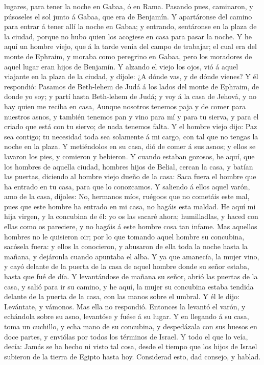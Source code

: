 lugares, para tener la noche en Gabaa, ó en Rama. 
Pasando pues, caminaron, y púsoseles el sol junto á Gabaa, que era de
Benjamín.  Y apartáronse del camino para entrar á tener
allí la noche en Gabaa; y entrando, sentáronse en la plaza de la ciudad,
porque no hubo quien los acogiese en casa para pasar la noche.
 Y he aquí un hombre viejo, que á la tarde venía del
campo de trabajar; el cual era del monte de Ephraim, y moraba como
peregrino en Gabaa, pero los moradores de aquel lugar eran hijos de
Benjamín.  Y alzando el viejo los ojos, vió á aquel
viajante en la plaza de la ciudad, y díjole: ¿A dónde vas, y de dónde
vienes?  Y él respondió: Pasamos de Beth-lehem de Judá á
los lados del monte de Ephraim, de donde yo soy; y partí hasta
Beth-lehem de Judá; y voy á la casa de Jehová, y no hay quien me reciba
en casa,  Aunque nosotros tenemos paja y de comer para
nuestros asnos, y también tenemos pan y vino para mí y para tu sierva, y
para el criado que está con tu siervo; de nada tenemos falta.
 Y el hombre viejo dijo: Paz sea contigo; tu necesidad
toda sea solamente á mi cargo, con tal que no tengas la noche en la
plaza.  Y metiéndolos en su casa, dió de comer á sus
asnos; y ellos se lavaron los pies, y comieron y bebieron.
 Y cuando estaban gozosos, he aquí, que los hombres de
aquella ciudad, hombres hijos de Belial, cercan la casa, y batían las
puertas, diciendo al hombre viejo dueño de la casa: Saca fuera el hombre
que ha entrado en tu casa, para que lo conozcamos.  Y
saliendo á ellos aquel varón, amo de la casa, díjoles: No, hermanos
míos, ruégoos que no cometáis este mal, pues que este hombre ha entrado
en mi casa, no hagáis esta maldad.  He aquí mi hija
virgen, y la concubina de él: yo os las sacaré ahora; humilladlas, y
haced con ellas como os pareciere, y no hagáis á este hombre cosa tan
infame.  Mas aquellos hombres no le quisieron oir; por lo
que tomando aquel hombre su concubina, sacósela fuera: y ellos la
conocieron, y abusaron de ella toda la noche hasta la mañana, y
dejáronla cuando apuntaba el alba.  Y ya que amanecía, la
mujer vino, y cayó delante de la puerta de la casa de aquel hombre donde
su señor estaba, hasta que fué de día.  Y levantándose de
mañana su señor, abrió las puertas de la casa, y salió para ir su
camino, y he aquí, la mujer su concubina estaba tendida delante de la
puerta de la casa, con las manos sobre el umbral.  Y él
le dijo: Levántate, y vámonos. Mas ella no respondió. Entonces la
levantó el varón, y echándola sobre su asno, levantóse y fuése á su
lugar.  Y en llegando á su casa, toma un cuchillo, y echa
mano de su concubina, y despedázala con sus huesos en doce partes, y
enviólas por todos los términos de Israel.  Y todo el que
lo veía, decía: Jamás se ha hecho ni visto tal cosa, desde el tiempo que
los hijos de Israel subieron de la tierra de Egipto hasta hoy.
Considerad esto, dad consejo, y hablad.

